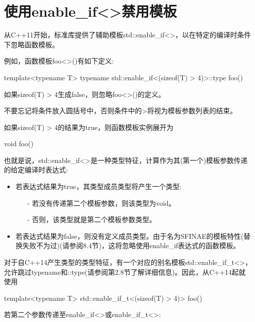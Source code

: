 \section{使用enable\_if<>禁用模板}
从C++11开始，标准库提供了辅助模板std::enable\_if<>，以在特定的编译时条件下忽略函数模板。

例如，函数模板foo<>()有如下定义:

\begin{cpp}
template<typename T>
typename std::enable_if<(sizeof(T) > 4)>::type
foo() {
}
\end{cpp}

如果sizeof(T) > 4生成false，则忽略foo<>()的定义。

\begin{notice}
不要忘记将条件放入圆括号中，否则条件中的>将视为模板参数列表的结束。
\end{notice}

如果sizeof(T) > 4的结果为true，则函数模板实例展开为

\begin{cpp}
void foo() {
}
\end{cpp}

也就是说，std::enable\_if<>是一种类型特征，计算作为其(第一个)模板参数传递的给定编译时表达式:

\begin{itemize}
\item 
若表达式结果为true，其类型成员类型将产生一个类型:

\begin{itemize}
\item[-]
若没有传递第二个模板参数，则该类型为void。
	
\item[-]
否则，该类型就是第二个模板参数类型。
\end{itemize}

\item 
若表达式结果为false，则没有定义成员类型。由于名为SFINAE的模板特性(替换失败不为过)(请参阅8.4节)，这将忽略使用enable\_if表达式的函数模板。
\end{itemize}

对于自C++14产生类型的类型特征，有一个对应的别名模板std::enable\_if\_t<>，允许跳过typename和::type(请参阅第2.8节了解详细信息)。因此，从C++14起就使用

\begin{cpp}
template<typename T>
std::enable_if_t<(sizeof(T) > 4)>
foo() {
}
\end{cpp}

若第二个参数传递至enable\_if<>或enable\_if\_t<>:

